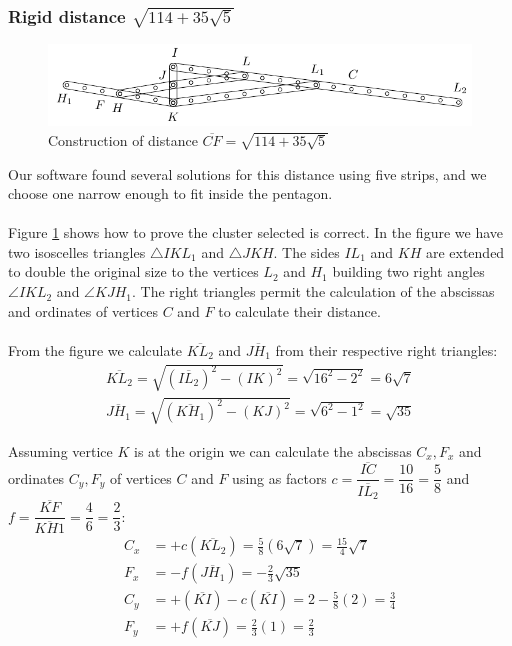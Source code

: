 \documentclass[11pt]{article}
\begin{document}
\subsubsection{Rigid distance $\sqrt{114+35\sqrt5}$}

\begin{figure}[h]
 \centering
 \includegraphics[scale=1.3]{10/cluster10a}
 \caption{Construction of distance $\overline{CF} = \sqrt{114+35\sqrt5}$}
 \label{fig:cluster10a}
\end{figure}

Our software found several solutions for this distance using five strips, and we choose one narrow enough to fit inside the pentagon.
\\\\
Figure \ref{fig:cluster10a} shows how to prove the cluster selected is correct. In the figure we have two isoscelles triangles $\triangle{IKL_1}$ and $\triangle{JKH}$. The sides $IL_1$ and $KH$ are extended to double the original size to the vertices $L_2$ and $H_1$ building two right angles $\angle{IKL_2}$ and $\angle{KJH_1}$. The right triangles permit the calculation of the abscissas and ordinates of vertices $C$ and $F$ to calculate their distance.
\\\\
From the figure we calculate $\overline{KL_2}$ and $\overline{JH_1}$ from their respective right triangles:
\begin{align}
\overline{KL_2} = \sqrt{(\overline{IL_2})^2 - (IK)^2} = \sqrt{16^2 - 2^2} = 6\sqrt7\\
\overline{JH_1} = \sqrt{(\overline{KH_1})^2 - (KJ)^2} = \sqrt{6^2 - 1^2} = \sqrt{35}
\end{align}

Assuming vertice $K$ is at the origin we can calculate the abscissas $C_x,F_x$ and ordinates $C_y,F_y$ of vertices $C$ and $F$ using as factors $c = \dfrac{\overline{IC}}{\overline{IL_2}} = \dfrac{10}{16} = \dfrac{5}8$ and $f = \dfrac{\overline{KF}}{\overline{KH1}}=\dfrac{4}6 = \dfrac{2}3$:
\begin{align}
C_x &= +c(\overline{KL_2}) = \frac{5}{8}(6\sqrt7) = \frac{15}{4}\sqrt7\\
F_x &= -f(\overline{JH_1}) = -\frac{2}{3}\sqrt{35}\\
C_y &= +(\overline{KI}) - c(\overline{KI}) = 2 - \frac{5}{8}(2) = \frac{3}4\\
F_y &= +f(\overline{KJ}) = \frac{2}{3}(1) = \frac{2}3
\end{align}
\end{document}

